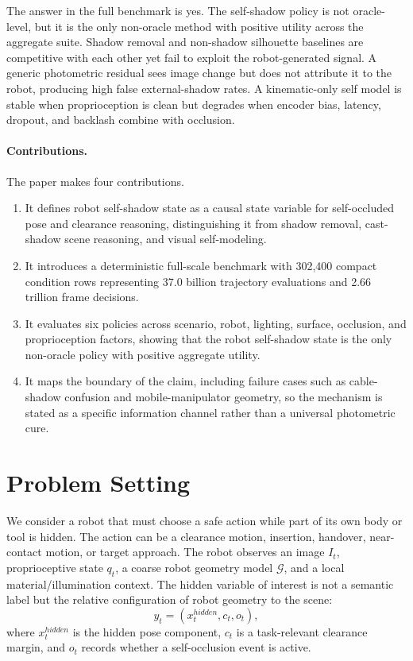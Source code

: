 \documentclass{article}
\newcommand{\pose}{x}
\newcommand{\geom}{\mathcal{G}}
\newcommand{\image}{I}
\newcommand{\occ}{o}
\newcommand{\clearance}{c}
\begin{document}
The answer in the full benchmark is yes. The self-shadow policy is not oracle-level, but it is the only non-oracle method with positive utility across the aggregate suite. Shadow removal and non-shadow silhouette baselines are competitive with each other yet fail to exploit the robot-generated signal. A generic photometric residual sees image change but does not attribute it to the robot, producing high false external-shadow rates. A kinematic-only self model is stable when proprioception is clean but degrades when encoder bias, latency, dropout, and backlash combine with occlusion.

\paragraph{Contributions.}
The paper makes four contributions.
\begin{enumerate}[leftmargin=1.5em]
\item It defines robot self-shadow state as a causal state variable for self-occluded pose and clearance reasoning, distinguishing it from shadow removal, cast-shadow scene reasoning, and visual self-modeling.
\item It introduces a deterministic full-scale benchmark with 302,400 compact condition rows representing 37.0 billion trajectory evaluations and 2.66 trillion frame decisions.
\item It evaluates six policies across scenario, robot, lighting, surface, occlusion, and proprioception factors, showing that the robot self-shadow state is the only non-oracle policy with positive aggregate utility.
\item It maps the boundary of the claim, including failure cases such as cable-shadow confusion and mobile-manipulator geometry, so the mechanism is stated as a specific information channel rather than a universal photometric cure.
\end{enumerate}

\section{Problem Setting}

We consider a robot that must choose a safe action while part of its own body or tool is hidden. The action can be a clearance motion, insertion, handover, near-contact motion, or target approach. The robot observes an image $\image_t$, proprioceptive state $q_t$, a coarse robot geometry model $\geom$, and a local material/illumination context. The hidden variable of interest is not a semantic label but the relative configuration of robot geometry to the scene:
\[
y_t = (\pose_t^{hidden}, \clearance_t, \occ_t),
\]
where $\pose_t^{hidden}$ is the hidden pose component, $\clearance_t$ is a task-relevant clearance margin, and $\occ_t$ records whether a self-occlusion event is active.
\end{document}
